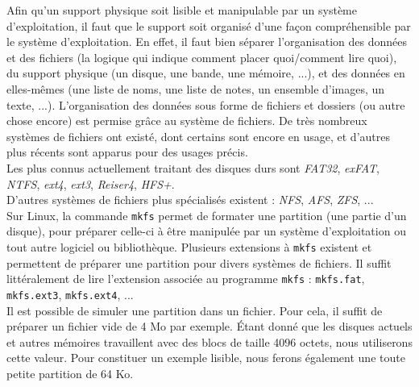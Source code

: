 \bigskip

Afin qu'un support physique soit lisible et manipulable par un système d'exploitation, il faut que le support soit organisé d'une façon compréhensible par le système d'exploitation.
En effet, il faut bien séparer l'organisation des données et des fichiers (la logique qui indique comment placer quoi/comment lire quoi), du support physique (un disque, une bande, une mémoire, ...), et des données en elles-mêmes (une liste de noms, une liste de notes, un ensemble d'images, un texte, ...).
L'organisation des données sous forme de fichiers et dossiers (ou autre chose encore) est permise grâce au système de fichiers.
De très nombreux systèmes de fichiers ont existé, dont certains sont encore en usage, et d'autres plus récents sont apparus pour des usages précis.\\
Les plus connus actuellement traitant des disques durs sont \textit{FAT32}, \textit{exFAT}, \textit{NTFS}, \textit{ext4}, \textit{ext3}, \textit{Reiser4}, \textit{HFS+}.\\
D'autres systèmes de fichiers plus spécialisés existent : \textit{NFS}, \textit{AFS}, \textit{ZFS}, ...\\

Sur Linux, la commande \texttt{mkfs} permet de formater une partition (une partie d'un disque), pour préparer celle-ci à être manipulée par un système d'exploitation ou tout autre logiciel ou bibliothèque.
Plusieurs extensions à \texttt{mkfs} existent et permettent de préparer une partition pour divers systèmes de fichiers.
Il suffit littéralement de lire l'extension associée au programme \texttt{mkfs} : \texttt{mkfs.fat}, \texttt{mkfs.ext3}, \texttt{mkfs.ext4}, ...\\

Il est possible de simuler une partition dans un fichier.
Pour cela, il suffit de préparer un fichier vide de 4 Mo par exemple.
\'Etant donné que les disques actuels et autres mémoires travaillent avec des blocs de taille 4096 octets, nous utiliserons cette valeur.
Pour constituer un exemple lisible, nous ferons également une toute petite partition de 64 Ko.\\

\\
\\

